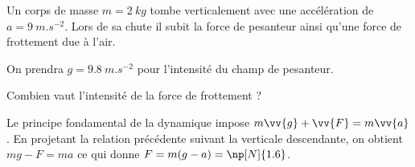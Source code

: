 
\finEntrainement










\hauteurLargeurCadreReponse		{6mm}{3cm}
\initialisationEntrainement

Un corps de masse $m=\SI{2}{kg}$ tombe verticalement avec une accélération de $a= \SI{9}{m.s^{-2}}$. Lors de sa chute il subit la force de pesanteur ainsi qu'une force de frottement due à l'air.

On prendra $g=\SI{9,8}{m.s^{-2}}$ pour l'intensité du champ de pesanteur.

\debutEntrainement


\begin{enonce}
Combien vaut l'intensité de la force de frottement ?	 
\end{enonce}


\begin{corrige}
	Le principe fondamental de la dynamique impose $m\vv{g}+\vv{F}=m \vv{a}$. En projetant la relation précédente suivant la verticale descendante, on obtient $mg-F=ma$ ce qui donne $F=m(g-a)=\np[N]{1.6}$. 
\end{corrige}


